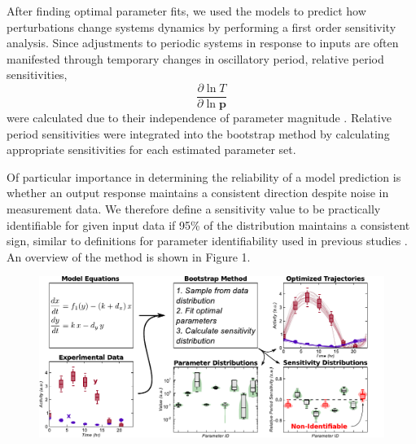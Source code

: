 After finding optimal parameter fits, we used the models to predict how
perturbations change systems dynamics by performing a first order
sensitivity analysis. Since adjustments to periodic systems in response to
inputs are often manifested through temporary changes in oscillatory period,
relative period sensitivities,
\begin{equation}
  \frac{\partial \ln T}{\partial \ln {\bm p}}
\end{equation}
were calculated due to their independence of parameter magnitude
\cite{Bure1974, Kramer1984, Wilkins2009}. Relative period sensitivities were
integrated into the bootstrap method by calculating appropriate sensitivities
for each estimated parameter set.

Of particular importance in determining the reliability of a model prediction
is whether an output response maintains a consistent direction despite noise in
measurement data. We therefore define a sensitivity value to be practically
identifiable for given input data if 95\% of the distribution maintains a
consistent sign, similar to definitions for parameter identifiability used in
previous studies \cite{Zak2003, Joshi2006}. An overview of the method is shown
in Figure 1.


\begin{figure}[h]
  \centering
  \includegraphics{chap3/figures/fig1.pdf}
  \label{fig:3_1}
\end{figure}

